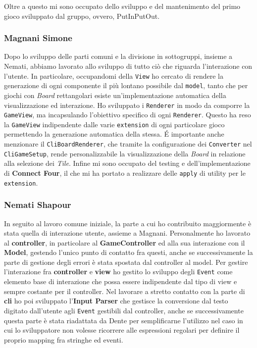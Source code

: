Oltre a questo mi sono occupato dello sviluppo e del mantenimento del primo gioco sviluppato dal gruppo, ovvero, PutInPutOut.

\subsubsection{Magnani Simone}
Dopo lo sviluppo delle parti comuni e la divisione in sottogruppi, insieme a Nemati, abbiamo lavorato allo sviluppo di tutto ciò che riguarda l'interazione con l'utente.
In particolare, occupandomi della \texttt{View} ho cercato di rendere la generazione di ogni componente il più lontano possibile dal \texttt{model}, tanto che per giochi con \textit{Board} rettangolari esiste un'implementazione automatica della visualizzazione ed interazione.
Ho sviluppato i \texttt{Renderer} in modo da comporre la \texttt{GameView}, ma incapsulando l'obiettivo specifico di ogni \texttt{Renderer}.
%
Questo ha reso la \texttt{GameView} indipendente dalle varie \texttt{extension} di ogni particolare gioco permettendo la generazione automatica della stessa.
%
\'E importante anche menzionare il \texttt{CliBoardRenderer}, che tramite la configurazione dei \texttt{Converter} nel \texttt{CliGameSetup}, rende personalizzabile la visualizzazione della \textit{Board} in relazione alla selezione dei \textit{Tile}.
Infine mi sono occupato del testing e dell'implementazione di \textbf{Connect Four}, il che mi ha portato a realizzare delle \texttt{apply} di utility per le \texttt{extension}.

\subsubsection{Nemati Shapour}
In seguito al lavoro comune iniziale, la parte a cui ho contribuito maggiormente è stata quella di interazione utente, assieme a Magnani.
Personalmente ho lavorato al \textbf{controller}, in particolare al \textbf{GameController} ed alla sua interazione con il \textbf{Model}, gestendo l'unico punto di contatto fra questi, anche se successivamente la parte di gestione degli errori è stata spostata dal controller al model.
Per gestire l'interazione fra \textbf{controller} e \textbf{view} ho gestito lo sviluppo degli \texttt{Event} come elemento base di interazione che possa essere indipendente dal tipo di view e sempre costante per il controller.
Nel lavorare a stretto contatto con la parte di \textbf{cli} ho poi sviluppato l'\textbf{Input Parser} che gestisce la conversione dal testo digitato dall'utente agli \texttt{Event} gestibili dal controller, anche se successivamente questa parte è stata riadattata da Dente per semplificarne l'utilizzo nel caso in cui lo sviluppatore non volesse ricorrere alle espressioni regolari per definire il proprio mapping fra stringhe ed eventi.

